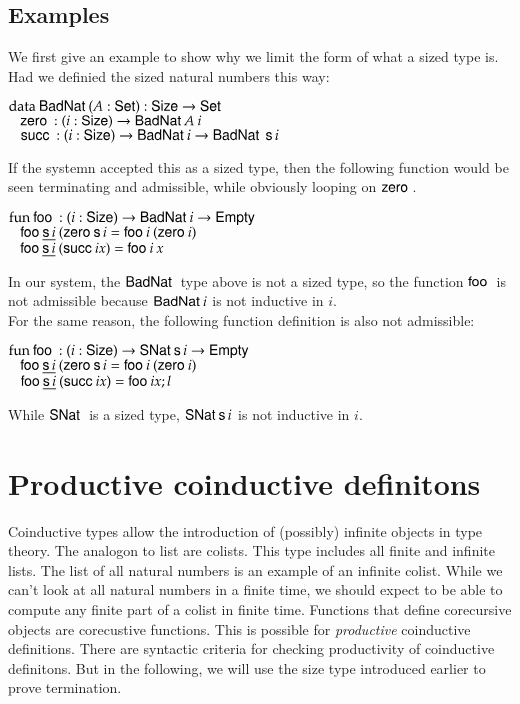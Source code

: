 \subsection{Examples}
We first give an example to show why we limit the form of what a sized type is.
Had we definied the sized natural numbers this way:
\begin{bsp}
$\mathrm{data}\: \mathsf{BadNat}\: ( A : \mathsf{Set} ) : \mathsf{Size} \rightarrow \mathsf{Set} $ \\
$\hspace*{3mm} \mathsf{zero}\: : ( i : \mathsf{Size} ) \rightarrow{ \mathsf{BadNat}\:A \: i} $\\
$\hspace*{3mm} \mathsf{succ}\: : ( i : \mathsf{Size} ) \rightarrow{\mathsf{BadNat}\:i \rightarrow\mathsf{BadNat}\:\: \mathsf{s}\,i} $
\end{bsp}
If the systemn accepted this as a sized type, then the following function would be seen terminating and admissible, while obviously looping on $\mathsf{zero}\:$.
\begin{bsp}
$\mathrm{fun}\: \mathsf{foo}\: : ( i : \mathsf{Size} ) \rightarrow{\mathsf{BadNat}\:i \rightarrow\mathsf{Empty}\:}$\\
$\hspace*{3mm} \mathsf{foo}\: \underline{\mathsf{s}\, i} \: (\mathsf{zero}\: \mathsf{s}\, i = \mathsf{foo}\: i \: (\mathsf{zero}\: i)$\\
$\hspace*{3mm} \mathsf{foo}\: \underline{\mathsf{s}\, i}\: (\mathsf{succ}\: i x) = \mathsf{foo}\: i \: x$
\end{bsp}
In our system, the $\mathsf{BadNat}\:$ type above is not a sized type, so the function $\mathsf{foo}\:$ is not admissible because $\mathsf{BadNat}\: i$ is not inductive in $i$.\\
For the same reason, the following function definition is also not admissible:
\begin{bsp}
$\mathrm{fun}\: \mathsf{foo}\: : ( i : \mathsf{Size} ) \rightarrow{\mathsf{SNat}\:\mathsf{s}\,i \rightarrow\mathsf{Empty}\:}$\\
$\hspace*{3mm} \mathsf{foo}\: \underline{\mathsf{s}\, i} \: (\mathsf{zero}\: \mathsf{s}\, i = \mathsf{foo}\: i \: (\mathsf{zero}\: i)$\\
$\hspace*{3mm} \mathsf{foo}\: \underline{\mathsf{s}\, i}\: (\mathsf{succ}\: i x) = \mathsf{foo}\: i x; l$
\end{bsp}
While $\mathsf{SNat}\:$ is a sized type, $\mathsf{SNat}\: \mathsf{s}\, i$ is not inductive in $i$.

\section{Productive coinductive definitons}
Coinductive types allow the introduction of (possibly) infinite objects in type theory.
The analogon to list are colists. This type includes all finite and infinite lists.
The list of all natural numbers is an example of an infinite colist.
While we can't look at all natural numbers in a finite time, we should expect to be able to
compute any finite part of a colist in finite time.
Functions that define corecursive objects are corecustive functions.
This is possible for \emph{productive} coinductive definitions.
There are syntactic criteria for checking productivity of coinductive definitons.
But in the following, we will use the size type introduced earlier to prove termination.

